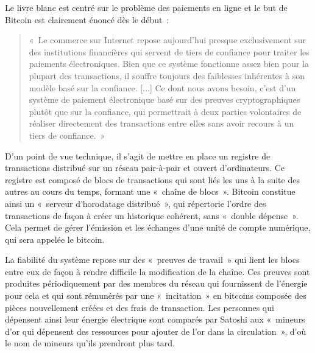Le livre blanc est centré sur le problème des paiements en ligne et le but de Bitcoin est clairement énoncé dès le début~:

\begin{quote}
«~Le commerce sur Internet repose aujourd'hui presque exclusivement sur des institutions financières qui servent de tiers de confiance pour traiter les paiements électroniques. Bien que ce système fonctionne assez bien pour la plupart des transactions, il souffre toujours des faiblesses inhérentes à son modèle basé sur la confiance. [...] Ce dont nous avons besoin, c'est d'un système de paiement électronique basé sur des preuves cryptographiques plutôt que sur la confiance, qui permettrait à deux parties volontaires de réaliser directement des transactions entre elles sans avoir recours à un tiers de confiance.~»
\end{quote}



D'un point de vue technique, il s'agit de mettre en place un registre de transactions distribué sur un réseau pair-à-pair et ouvert d'ordinateurs. Ce registre est composé de blocs de transactions qui sont liés les uns à la suite des autres au cours du temps, formant une «~chaîne de blocs~». Bitcoin constitue ainsi un «~serveur d'horodatage distribué~», qui répertorie l'ordre des transactions de façon à créer un historique cohérent, sans «~double dépense~». Cela permet de gérer l'émission et les échanges d'une unité de compte numérique, qui sera appelée le bitcoin.

La fiabilité du système repose sur des «~preuves de travail~» qui lient les blocs entre eux de façon à rendre difficile la modification de la chaîne. Ces preuves sont produites périodiquement par des membres du réseau qui fournissent de l'énergie pour cela et qui sont rémunérés par une «~incitation~» en bitcoins composée des pièces nouvellement créées et des frais de transaction. Les personnes qui dépensent ainsi leur énergie électrique sont comparés par Satoshi aux «~mineurs d'or qui dépensent des ressources pour ajouter de l'or dans la circulation~», d'où le nom de mineurs qu'ils prendront plus tard.


